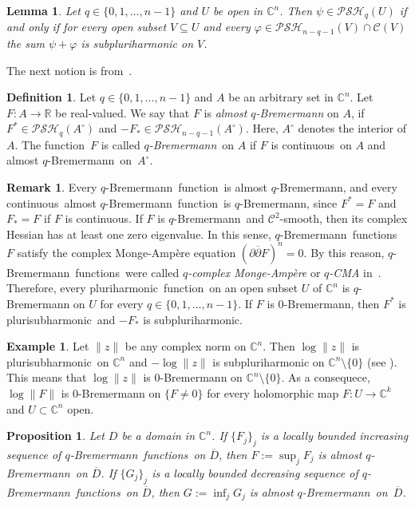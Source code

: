 \documentclass[reqno]{amsart}
\newtheorem{lem}[thm]{Lemma}
\newtheorem{prop}[thm]{Proposition}
\theoremstyle{definition}
\newtheorem{defn}[thm]{Definition}
\newtheorem{ex}[thm]{Example}
\newtheorem{rem}[thm]{Remark}
\numberwithin{equation}{section}
\newcommand{\cbb}{\mathbb{C}}
\newcommand{\rbb}{\mathbb{R}}
\newcommand{\ccal}{\mathcal{C}}
\newcommand{\qbrem}{$q$-Bremermann}
\newcommand{\ph}{pluri\-harmonic}
\newcommand{\psh}{pluri\-sub\-harmonic}
\newcommand{\PSH}{\mathcal{PSH}}
\newcommand{\cl}[1]{\overline{#1}}
\newcommand{\cont}{continuous}
\newcommand{\fct}{function}
\newcommand{\fcts}{functions}
\newcommand{\cld}{\overline{D}}
\begin{document}
\begin{lem}\label{lem-char-qpsh} Let $q \in \{0,1,\ldots,n-1\}$ and $U$ be open in $\cbb^n$. Then $\psi \in \PSH_q(U)$ if and only if for every open subset $V \subseteq U$ and every $\varphi \in \PSH_{n-q-1}(V) \cap \ccal(V)$ the sum $\psi+\varphi$ is subpluriharmonic on $V$.
\end{lem}

The next notion is from~\cite{Sl84}. 

\begin{defn}\label{defqBrem} Let $q\in\{ 0,1,\ldots,n{-}1\}$ and $A$ be an arbitrary set in $\cbb^n$. Let $F:A\to\rbb$ be real-valued. We say that $F$ is \textit{almost \qbrem} on $A$, if $F^* \in \PSH_{q}(A^\circ)$ and $-F_* \in \PSH_{n-q-1}(A^\circ)$. Here, $A^\circ$ denotes the interior of $A$. The \fct\ $F$ is called \textit{\qbrem}\ on $A$ if $F$ is \cont\ on $A$ and almost \qbrem\ on~$A^\circ$.
\end{defn}

\begin{rem} Every \qbrem\ \fct\ is almost \qbrem, and every \cont\ almost \qbrem\ \fct\ is \qbrem, since $F^*=F$ and $F_*=F$ if $F$ is \cont. If $F$ is \qbrem\ and $\ccal^2$-smooth, then its complex Hessian has at least one zero eigenvalue. In this sense, \qbrem\ \fcts\ $F$ satisfy the complex Monge-Amp\`ere equation $(\partial\cl{\partial} F)^n=0$. By this reason, \qbrem\ \fcts\ were called \textit{$q$-complex Monge-Amp\`ere} or \textit{$q$-CMA} in~\cite{HM}. Therefore, every \ph\ \fct\ on an open subset $U$ of $\cbb^n$ is $q$-Bremermann on $U$ for every $q\in\{0,1,\ldots,n-1\}$. If $F$ is $0$-Bremermann, then $F^*$ is \psh\ and $-F_*$ is subpluriharmonic.
\end{rem}

\begin{ex} Let $\|z\|$ be any complex norm on $\cbb^n$. Then $\log\|z\|$ is \psh\ on $\cbb^n$ and $-\log\|z\|$ is subpluriharmonic on $\cbb^n\setminus\{0\}$ (see \cite{TPESZ}). This means that $\log\|z\|$ is $0$-Bremermann on $\cbb^n\setminus\{0\}$. As a consequece, $\log\|F\|$ is $0$-Bremermann on $\{F \neq 0\}$ for every holomorphic map $F:U \to \cbb^k$ and $U \subset \cbb^n$ open.
\end{ex}

\begin{prop}\label{prop-sup-inf-qbrem} Let $D$ be a domain in $\cbb^n$. If $\{F_j\}_j$ is a locally bounded increasing sequence of \qbrem\ \fcts\ on $\cld$, then $F:=\sup_j F_j$ is almost \qbrem\ on $\cld$. If $\{G_j\}_j$ is a locally bounded decreasing sequence of \qbrem\ \fcts\ on $\cld$, then $G:=\inf_j G_j$ is almost \qbrem\ on~$\cld$. 
\end{prop}
\end{document}
